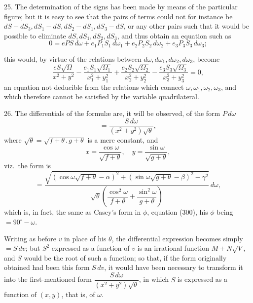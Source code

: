 \documentclass[11pt,a4paper]{article}
\begin{document}
\medskip

25. The determination of the signs has been made by means of the particular figure; but it is easy to see that the pairs of terms could not for instance be $dS - dS_{3}, dS_{1} - dS, dS_{2} - dS_{1}, dS_{3} - dS$, or any other pairs such that it would be possible to eliminate $dS, dS_{1}, dS_{2}, dS_{3}$, and thus obtain an equation such as
\[
0 = ePS\,d\omega + e_{1}P_{1}S_{1}\,d\omega_{1} + e_{2}P_{2}S_{2}\,d\omega_{2} + e_{3}P_{3}S_{3}\,d\omega_{3};
\]

\newpage


\noindent this would, by virtue of the relations between $d\omega, d\omega_{1}, d\omega_{2}, d\omega_{3}$, become
\[
\frac{eS\sqrt{\Omega}}{x^{2} + y^{2}} - \frac{e_{1}S_{1}\sqrt{\Omega_{1}}}{x_{1}^{2} + y_{1}^{2}} + \frac{e_{2}S_{2}\sqrt{\Omega_{2}}}{x_{2}^{2} + y_{2}^{2}} - \frac{e_{3}S_{3}\sqrt{\Omega_{3}}}{x_{3}^{2} + y_{3}^{2}} = 0,
\]
an equation not deducible from the relations which connect $\omega, \omega_{1}, \omega_{2}, \omega_{3}$, and which therefore cannot be satisfied by the variable quadrilateral.

\medskip

26. The differentials of the formul\ae{} are, it will be observed, of the form $P\,d\omega$
\[
= \frac{S\,d\omega}{(x^{2} + y^{2})\sqrt{\theta}},
\]
where $\sqrt{\theta} = \sqrt{f + \theta\,.\,g + \theta}$ is a mere constant, and
\[
x = \frac{\cos\omega}{\sqrt{f + \theta}}, \quad y = \frac{\sin\omega}{\sqrt{g + \theta}},
\]
viz.\ the form is
\[
= \frac{\sqrt{(\cos\omega\sqrt{f + \theta} - \alpha)^{2} + (\sin\omega\sqrt{g + \theta} - \beta)^{2} - \gamma^{2}}}{\sqrt{\theta}\left(\dfrac{\cos^{2}\omega}{f + \theta} + \dfrac{\sin^{2}\omega}{g + \theta}\right)}\,d\omega,
\]
which is, in fact, the same as Casey's form in $\phi$, equation (300), his $\phi$ being $= 90^{\circ} - \omega$.

\medskip

Writing as before $v$ in place of his $\theta$, the differential expression becomes simply $= S\,dv$; but $S^{2}$ expressed as a function of $v$ is an irrational function $M + N\sqrt{V}$, and $S$ would be the root of such a function; so that, if the form originally obtained had been this form $S\,dv$, it would have been necessary to transform it into the first-mentioned form $\dfrac{S\,d\omega}{(x^{2} + y^{2})\sqrt{\theta}}$, in which $S$ is expressed as a function of $(x, y)$, that is, of $\omega$.
\end{document}
